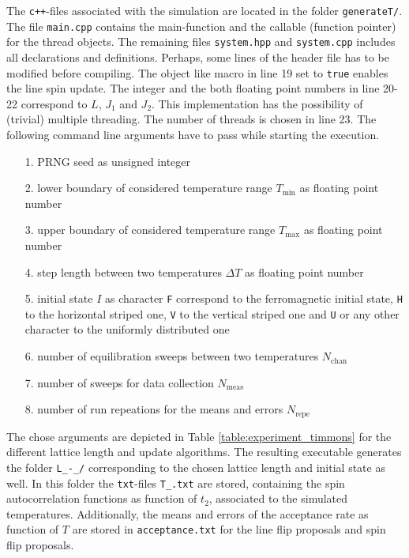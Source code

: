The \verb|c++|-files associated with the simulation are located in the folder \verb|generateT/|. The file \verb|main.cpp| contains the main-function and
the callable (function pointer) for the thread objects. The remaining files \verb|system.hpp| and \verb|system.cpp| includes all declarations and definitions.
Perhaps, some lines of the header file has to be modified before compiling. The object like macro in line 19 set to \verb|true| enables the line spin update.
The integer and the both floating point numbers in line 20-22 correspond to $L$, $J_1$ and $J_2$. This implementation has the possibility of (trivial) multiple 
threading. The number of threads is chosen in line 23. The following command line arguments have to pass while starting the execution.
\begin{itemize}
  \item[1.] PRNG seed as unsigned integer
  \item[2.] lower boundary of considered temperature range $T_\mathrm{min}$ as floating point number
  \item[3.] upper boundary of considered temperature range $T_\mathrm{max}$ as floating point number
  \item[4.] step length between two temperatures $\Delta T$ as floating point number
  \item[5.] initial state $I$ as character \verb|F| correspond to the ferromagnetic initial state, \verb|H| to the horizontal striped one, \verb|V| to the
            vertical striped one and \verb|U| or any other character to the uniformly distributed one
  \item[6.] number of equilibration sweeps between two temperatures $N_\mathrm{chan}$
  \item[7.] number of sweeps for data collection $N_\mathrm{meas}$
  \item[8.] number of run repeations for the means and errors $N_\mathrm{repe}$
\end{itemize}
The chose arguments are depicted in Table \ref{table:experiment_timmons} for the different lattice length and update algorithms. The resulting executable
generates the folder \verb|L_-_/| corresponding to the chosen lattice length and initial state as well. In this folder the \verb|txt|-files \verb|T_.txt| 
are stored, containing the spin autocorrelation functions as function of $t_2$, associated to the simulated temperatures. Additionally, the
means and errors of the acceptance rate as function of $T$ are stored in \verb|acceptance.txt| for the line flip proposals and spin flip proposals.

